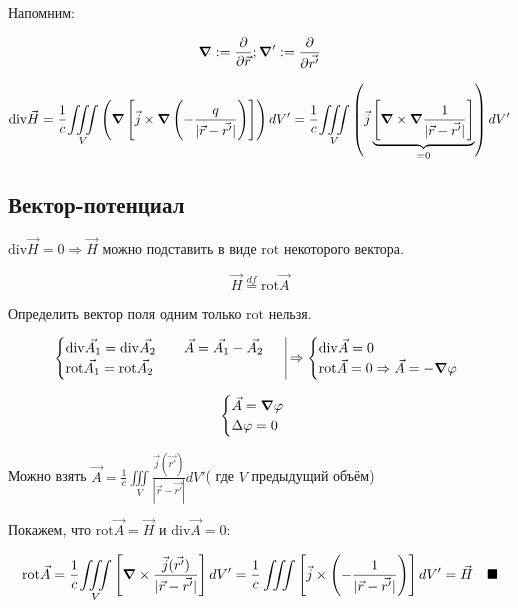 Напомним: 

\[
\grad:=\frac{\partial}{\partial \vec{r}}; \grad ' := \frac{\partial}{\partial \vec{r'}}
\]

\[
\mathrm{div}\vec{H}=\frac{1}{c}\underset{V}{\iiint}\left( \grad \left[ \vec{j} \times \grad \left( -\frac{q}{|\vec{r}-\vec{r'}|}  \right) \right] \right)dV'= \frac{1}{c}\underset{V}{\iiint}\left( \vec{j}\underbrace{\left[ \grad \times \grad \frac{1}{|\vec{r}-\vec{r'}|}  \right]}_{=0} \right)dV'
\]

\subsection*{Вектор-потенциал}

$\mathrm{div}\vec{H}=0\Rightarrow \vec{H} $ можно подставить в виде $\mathrm{rot} $ некоторого вектора.

\[
\vec{H}\overset{df}{=}\mathrm{rot}\vec{A} 
\]

Определить вектор поля одним только $\mathrm{rot} $ нельзя. 

\[
\begin{aligned}
    \begin{array}{l|l}
        \begin{cases}
            \mathrm{div}\vec{A_1}=\mathrm{div}\vec{A_2} \qquad \vec{A}=\vec{A_1}-\vec{A_2} \\
            \mathrm{rot}\vec{A_1}=\mathrm{rot}\vec{A_2}    
        \end{cases}   
    \end{array}
    \Rightarrow
    \begin{cases}
        \mathrm{div}\vec{A}=0 \\
        \mathrm{rot}\vec{A}=0 \Rightarrow \vec{A}=-\grad\varphi 
    \end{cases}
\end{aligned}
\]

\[
\begin{cases}
    \vec{A}=\grad\varphi \\
    \Delta\varphi=0
\end{cases}
\]

Можно взять $\vec{A}=\frac{1}{c}\underset{V}{\iiint} \frac{\vec{j}(\vec{r'})}{|\vec{r}-\vec{r'}|}dV'$( где $V$ предыдущий объём)

Покажем, что $\mathrm{rot}\vec{A}=\vec{H} \text{ и } \mathrm{div}\vec{A}=0: $

\[
\mathrm{rot}\vec{A}=\frac{1}{c}\underset{V}{\iiint} \left[ \grad \times \frac{\vec{j}(\vec{r'})}{|\vec{r}-\vec{r'}|}  \right]dV'=\frac{1}{c}\iiint \left[ \vec{j}\times \left( -\frac{1}{|\vec{r}-\vec{r'}|}  \right) \right] dV'=\vec{H} \quad \blacksquare
\]

